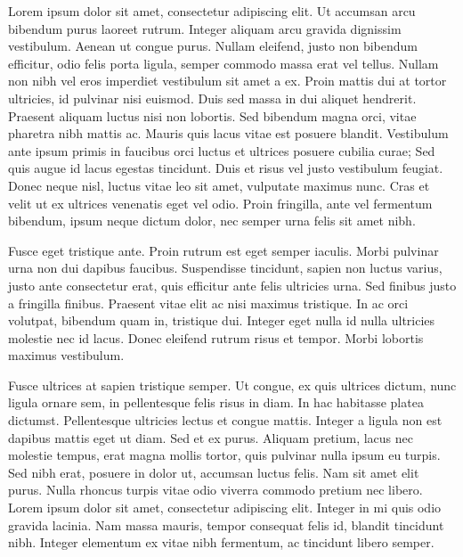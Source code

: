 Lorem ipsum dolor sit amet, consectetur adipiscing elit. Ut accumsan arcu bibendum purus laoreet rutrum. Integer aliquam arcu gravida dignissim vestibulum. Aenean ut congue purus. Nullam eleifend, justo non bibendum efficitur, odio felis porta ligula, semper commodo massa erat vel tellus. Nullam non nibh vel eros imperdiet vestibulum sit amet a ex. Proin mattis dui at tortor ultricies, id pulvinar nisi euismod. Duis sed massa in dui aliquet hendrerit. Praesent aliquam luctus nisi non lobortis. Sed bibendum magna orci, vitae pharetra nibh mattis ac. Mauris quis lacus vitae est posuere blandit. Vestibulum ante ipsum primis in faucibus orci luctus et ultrices posuere cubilia curae; Sed quis augue id lacus egestas tincidunt. Duis et risus vel justo vestibulum feugiat. Donec neque nisl, luctus vitae leo sit amet, vulputate maximus nunc. Cras et velit ut ex ultrices venenatis eget vel odio. Proin fringilla, ante vel fermentum bibendum, ipsum neque dictum dolor, nec semper urna felis sit amet nibh. \cite{klatzky2013haptic}

Fusce eget tristique ante. Proin rutrum est eget semper iaculis. Morbi pulvinar urna non dui dapibus faucibus. Suspendisse tincidunt, sapien non luctus varius, justo ante consectetur erat, quis efficitur ante felis ultricies urna. Sed finibus justo a fringilla finibus. Praesent vitae elit ac nisi maximus tristique. In ac orci volutpat, bibendum quam in, tristique dui. Integer eget nulla id nulla ultricies molestie nec id lacus. Donec eleifend rutrum risus et tempor. Morbi lobortis maximus vestibulum.

Fusce ultrices at sapien tristique semper. Ut congue, ex quis ultrices dictum, nunc ligula ornare sem, in pellentesque felis risus in diam. In hac habitasse platea dictumst. Pellentesque ultricies lectus et congue mattis. Integer a ligula non est dapibus mattis eget ut diam. Sed et ex purus. Aliquam pretium, lacus nec molestie tempus, erat magna mollis tortor, quis pulvinar nulla ipsum eu turpis. Sed nibh erat, posuere in dolor ut, accumsan luctus felis. Nam sit amet elit purus. Nulla rhoncus turpis vitae odio viverra commodo pretium nec libero. Lorem ipsum dolor sit amet, consectetur adipiscing elit. Integer in mi quis odio gravida lacinia. Nam massa mauris, tempor consequat felis id, blandit tincidunt nibh. Integer elementum ex vitae nibh fermentum, ac tincidunt libero semper.

